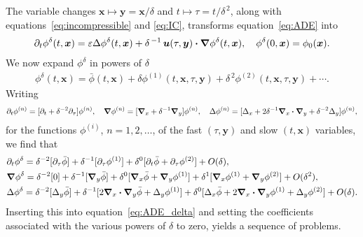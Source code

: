 \documentclass[leqno,onefignum,onetabnum]{siamltex1213}
\newcommand\bnabla{\mbox{\boldmath${\nabla}$}}
\providecommand\bcdot{\boldsymbol{\cdot}}
\newcommand{\vecx}{\boldsymbol{x}}
\newcommand{\vecy}{\boldsymbol{y}}
\newcommand{\vecu}{\boldsymbol{u}}
\begin{document}
The variable changes $\vecx\mapsto\vecy=\vecx/\delta$ and
$t\mapsto\tau=t/\delta^{\,2}$, along with equations~\eqref{eq:incompressible} and
\eqref{eq:IC}, transforms equation~\eqref{eq:ADE}
into~\cite{McLaughlin:SIAM_JAM:780}     
%
\begin{align}%
  \partial_t\phi^\delta(t,\vecx)=\varepsilon\Delta\phi^\delta(t,\vecx)
                 +\delta^{\,-1}\,\vecu (\tau,\vecy)\bcdot\bnabla \phi^\delta(t,\vecx), \quad
      \phi^\delta(0,\vecx)=\phi_0(\vecx).
\end{align}
%
We now expand $\phi^\delta$ in powers of $\delta$~\cite{McLaughlin:SIAM_JAM:780} 
%
\begin{align}\label{eq:Expand}
  \phi^\delta(t,\vecx)=\bar{\phi}(t,\vecx)
                 +\delta\phi^{(1)}(t,\vecx,\tau,\vecy)
                 +\delta^{\,2}\phi^{(2)}(t,\vecx,\tau,\vecy)+\cdots.
\end{align}
%
Writing
%
\begin{align*}
  \partial_t\phi^{(n)}=[\partial_t+\delta^{-2}\partial_\tau]\phi^{(n)}, \quad
  \bnabla \phi^{(n)}=[\bnabla _x+\delta^{-1}\bnabla _y]\phi^{(n)}, \quad
  \Delta\phi^{(n)}=[\Delta_x+2\delta^{-1}\bnabla _x\bcdot\bnabla _y+\delta^{-2}\Delta_y]\phi^{(n)},
\end{align*}
%
for the functions $\phi^{(i)}$, $n=1,2,\ldots$, of the fast $(\tau,\vecy)$ and
slow $(t,\vecx)$ variables, we find that
%
\begin{align}
  &\partial_t\phi^\delta=\delta^{-2}[\partial_\tau\bar{\phi}]
      +\delta^{-1}[\partial_\tau\phi^{(1)}]
      +\delta^0[\partial_t\bar{\phi}+\partial_\tau\phi^{(2)}]+O(\delta),
      \\
  &\bnabla \phi^\delta=\delta^{-2}[0]
            +\delta^{-1}[\bnabla _y\bar{\phi}]
            +\delta^0[\bnabla _x\bar{\phi}+\bnabla _y\phi^{(1)}]
            +\delta^1[\bnabla _x\phi^{(1)}+\bnabla _y\phi^{(2)}]+O(\delta^2),
            \notag\\
  &\Delta\phi^\delta=\delta^{-2}[\Delta_y\bar{\phi}]
      +\delta^{-1}[2\bnabla _x\bcdot\bnabla _y\bar{\phi}+\Delta_y\phi^{(1)}]
      +\delta^0[\Delta_x\bar{\phi}+2\bnabla _x\bcdot\bnabla _y\phi^{(1)}+\Delta_y\phi^{(2)}]+O(\delta).
      \notag
\end{align}
%
Inserting this into equation~\eqref{eq:ADE_delta} and setting the
coefficients associated with the various powers of $\delta$ to zero,
yields a sequence of problems.
\end{document}
